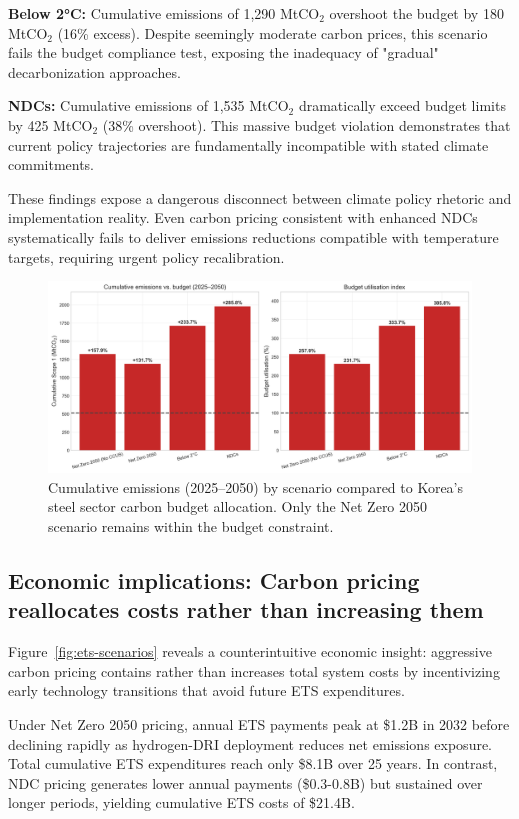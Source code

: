 \documentclass[preprint,5p,authoryear]{elsarticle}
\begin{document}
\textbf{Below 2°C:} Cumulative emissions of 1,290 MtCO$_2$ overshoot the budget by 180 MtCO$_2$ (16\% excess). Despite seemingly moderate carbon prices, this scenario fails the budget compliance test, exposing the inadequacy of "gradual" decarbonization approaches.

\textbf{NDCs:} Cumulative emissions of 1,535 MtCO$_2$ dramatically exceed budget limits by 425 MtCO$_2$ (38\% overshoot). This massive budget violation demonstrates that current policy trajectories are fundamentally incompatible with stated climate commitments.

These findings expose a dangerous disconnect between climate policy rhetoric and implementation reality. Even carbon pricing consistent with enhanced NDCs systematically fails to deliver emissions reductions compatible with temperature targets, requiring urgent policy recalibration.

\begin{figure}[!t]
  \centering
  \includegraphics[width=0.85\linewidth]{carbon_budget_compliance}
  \caption{Cumulative emissions (2025--2050) by scenario compared to Korea's steel sector carbon budget allocation. Only the Net Zero 2050 scenario remains within the budget constraint.}
  \label{fig:carbon-budget}
\end{figure}

\subsection{Economic implications: Carbon pricing reallocates costs rather than increasing them}

Figure~\ref{fig:ets-scenarios} reveals a counterintuitive economic insight: aggressive carbon pricing contains rather than increases total system costs by incentivizing early technology transitions that avoid future ETS expenditures.

Under Net Zero 2050 pricing, annual ETS payments peak at \$1.2B in 2032 before declining rapidly as hydrogen-DRI deployment reduces net emissions exposure. Total cumulative ETS expenditures reach only \$8.1B over 25 years. In contrast, NDC pricing generates lower annual payments (\$0.3-0.8B) but sustained over longer periods, yielding cumulative ETS costs of \$21.4B.
\end{document}
